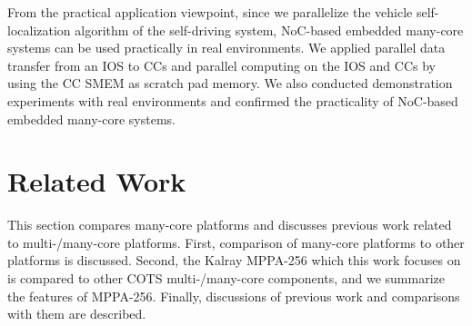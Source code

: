   From the practical application viewpoint, since we parallelize the vehicle self-localization algorithm of the self-driving system, NoC-based embedded many-core systems can be used practically in real environments.
  We applied parallel data transfer from an IOS to CCs and parallel computing on the IOS and CCs by using the CC SMEM as scratch pad memory.    
  We also conducted demonstration experiments with real environments and confirmed the practicality of NoC-based embedded many-core systems.
  
  \chapter{Related Work}
  \label{sec:related_work}
  This section compares many-core platforms and discusses previous work related to multi-/many-core platforms.
  First, comparison of many-core platforms to other platforms is discussed.
  Second, the Kalray MPPA-256 which this work focuses on is compared to other COTS multi-/many-core components, and we summarize the features of MPPA-256.
  Finally, discussions of previous work and comparisons with them are described.
  
  
